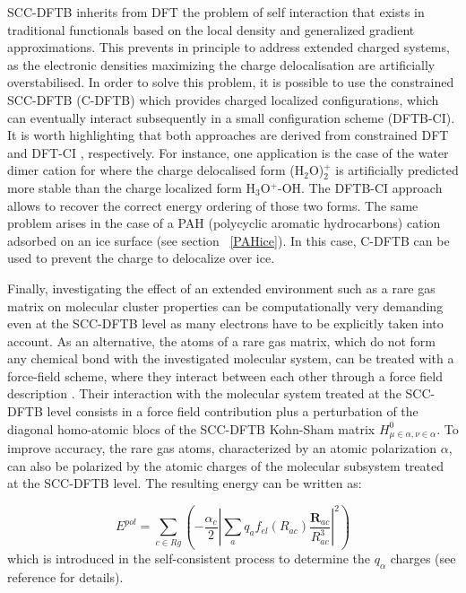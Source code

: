 \documentclass[]{interact}
\theoremstyle{plain}%
\theoremstyle{definition}
\theoremstyle{remark}
\begin{document}
SCC-DFTB inherits from DFT the problem of self interaction that exists in traditional functionals based on the local density and generalized gradient 
approximations. This prevents in principle to address  extended charged systems, as the electronic densities maximizing the charge delocalisation are artificially overstabilised. In order to solve this problem, it is possible to use the constrained SCC-DFTB \cite{ionic_coro,Hourahine10,dftb_ci} (C-DFTB) which provides charged localized configurations, which can eventually interact subsequently in a small configuration scheme (DFTB-CI). It is worth highlighting that
both approaches are derived from constrained DFT \cite{const_dft} and DFT-CI \cite{Wu09}, respectively.
For instance, one application is the case of the water dimer cation for where the charge delocalised form (H$_2$O)$_{2}^{+}$ is artificially
predicted more stable than the charge localized form H$_3$O$^+$-OH. The DFTB-CI approach allows to recover the correct energy ordering 
of those two forms. The same problem arises in the case of a PAH (polycyclic aromatic hydrocarbons) cation adsorbed on an ice surface (see section~ \ref{PAHice}). In this case, C-DFTB  can be used to prevent the charge to delocalize over ice.

Finally, investigating the effect of an extended environment such as a rare gas matrix on molecular cluster properties can be computationally
very demanding even at the SCC-DFTB level as many electrons have to be explicitly taken into account. As an alternative, the atoms of a rare
gas matrix, which do not form any chemical bond with the investigated molecular system, can be treated with a force-field scheme,
where they interact between each other through a force field description \cite{Iftner_JCP2014}.  Their interaction with the molecular system treated
at the SCC-DFTB level consists in a force field contribution plus a perturbation of  the diagonal homo-atomic blocs of the SCC-DFTB Kohn-Sham
matrix $H^0_{\mu\in \alpha,\nu\in\alpha}$.
To improve  accuracy, the rare gas atoms, characterized by an atomic  polarization $\alpha$, can also be polarized by the atomic charges of the
molecular subsystem treated at the SCC-DFTB level. The resulting energy can be written as:

\begin{equation}
E^{pol} =\sum_{c\in Rg} (-\frac{\alpha_c}{2} |\sum_{a}  q_a f_{el}(R_{a c})\frac{\mathbf {R}_{a c}}{R_{a c}^3}|^2)
\label{Epol}
\end{equation}
which is introduced in the self-consistent process to determine the $q_\alpha$ charges (see reference \cite{Iftner_JCP2014} for details).
\end{document}

